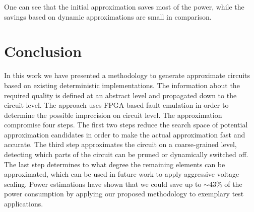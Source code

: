\documentclass[conference]{IEEEtran}
\begin{document}
One can see that the initial approximation saves most of the power, while the savings based on dynamic approximations are small in comparison. 

\section{Conclusion}
\label{sec:conclusion}
In this work we have presented a methodology to generate approximate circuits based on existing deterministic implementations. The information about the required quality is defined at an abstract level and propagated down to the circuit level. The approach uses FPGA-based fault emulation in order to determine the possible imprecision on circuit level. The approximation compromise four steps. The first two steps reduce the search space of potential approximation candidates in order to make the actual approximation fast and accurate. The third step approximates the circuit on a coarse-grained level, detecting which parts of the circuit can be pruned or dynamically switched off. The last step determines to what degree the remaining elements can be approximated, which can be used in future work to apply aggressive voltage scaling. Power estimations have shown that we could save up to $\sim43\%$ of the power consumption by applying our proposed methodology to exemplary test applications.

















\end{document}
